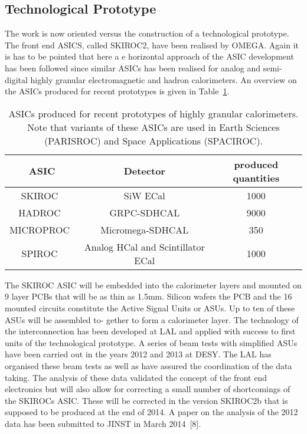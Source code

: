 \subsection{Technological Prototype}
The work is now oriented versus the construction of a technological prototype. The front end ASICS, called SKIROC2, have been realised by OMEGA. Again it is has to be pointed that here a e horizontal approach of the ASIC development has been followed since similar ASICs has been realised for analog and semi-digital highly granular electromagnetic and hadron calorimeters. An overview on the ASICs produced for recent prototypes is given in Table~\ref{tab:LALElectronics}.
\begin{table}
\caption{ASICs produced for recent prototypes of highly granular calorimeters. Note that variants of these ASICs are used in Earth Sciences (PARISROC) and Space Applications (SPACIROC).}
\label{tab:LALElectronics}
\begin{tabular}{|c|c|c|}
	\hline
	ASIC & Detector & produced quantities \\
	\hline
	SKIROC~\cite{1748-0221-6-12-C12040} & SiW ECal & 1000 \\
	HADROC~\cite{5874060} & GRPC-SDHCAL & 9000 \\
	MICROPROC~\cite{1748-0221-7-01-C01029} & Micromega-SDHCAL & 350 \\
	SPIROC~\cite{1748-0221-8-01-C01027} & Analog HCal and Scintillator ECal & 1000 \\
	\hline
\end{tabular}
\end{table}
The SKIROC ASIC will be embedded into the calorimeter layers and mounted on 9 layer PCBs that will be as thin as 1.5mm. Silicon wafers the PCB and the 16 mounted circuits constitute the Active Signal Units or ASUs. Up to ten of these ASUs will be assembled to- gether to form a calorimeter layer. The technology of the interconnection has been developed at LAL and applied with success to first units of the technological prototype.
A series of beam tests with simplified ASUs have been carried out in the years 2012 and 2013 at DESY. The LAL has organised these beam tests as well as have assured the coordination of the data taking. The analysis of these data validated the concept of the front end electronics but will also allow for correcting a small number of shortcomings of the SKIROCs ASIC. These will be corrected in the version SKIROC2b that is supposed to be produced at the end of 2014. A paper on the analysis of the 2012 data has been submitted to JINST in March 2014~\cite{Rouene2013470}[8].
